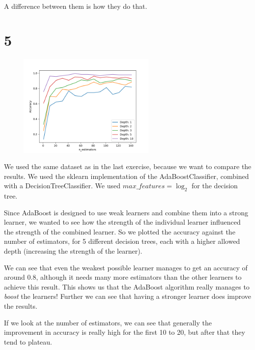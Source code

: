 \documentclass[11pt]{article}
\begin{document}
A difference between them is how they do that.

\section*{5}

\begin{figure}[h]
	\centering
	\includegraphics[width=0.6\textwidth]{images/ex2_5_depth_estimators}
	\caption{}
\end{figure}
We used the same dataset as in the last exercise, because we want to compare the results. We used the sklearn implementation of the AdaBoostClassifier, combined with a DecisionTreeClassifier.  We used  $max\_features=\log_2$ for the decision tree.


Since AdaBoost is designed to use weak learners and combine them into a strong learner, we wanted to see how the strength of the individual learner influenced the strength of the combined learner. So we plotted the accuracy against the number of estimators, for 5 different decision trees, each with a higher allowed depth (increasing the strength of the learner). 

We can see that even the weakest possible learner manages to get an accuracy of around 0.8, although it needs many more estimators than the other learners to achieve this result. This shows us that the AdaBoost algorithm really manages to \emph{boost} the learners! Further we can see that having a stronger learner does improve the results.

If we look at the number of estimators, we can see that generally the improvement in accuracy is really high for the first 10 to 20, but after that they tend to plateau.
\end{document}
